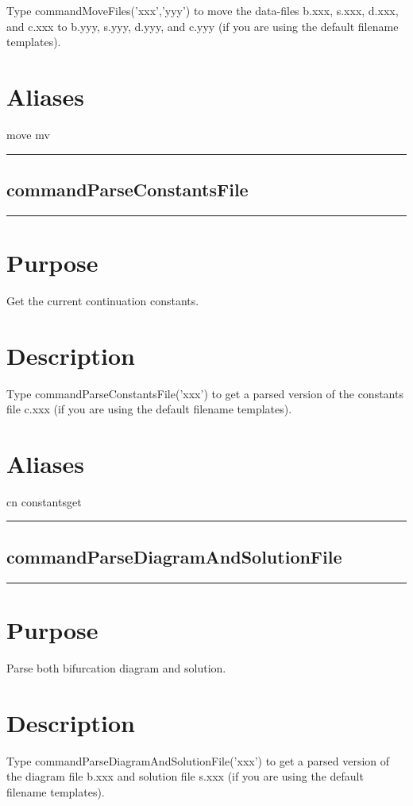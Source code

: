 \documentclass[12pt]{report}
\begin{document}
\begin{minipage}{6in}
    Type commandMoveFiles('xxx','yyy') to move the data-files b.xxx, s.xxx, d.xxx,
    and c.xxx to b.yyy, s.yyy, d.yyy, and c.yyy (if you are using the
    default filename templates).  \section*{Aliases}
move mv \medskip\hrule\end{minipage}\subsection{commandParseConstantsFile} \label{sec:clui_ref_commandParseConstantsFile}\begin{minipage}{6in}\hrule\medskip\section*{Purpose}
Get the current continuation constants.\section*{Description}

    Type commandParseConstantsFile('xxx') to get a parsed version of the constants file
    c.xxx (if you are using the default filename templates).
    \section*{Aliases}
cn constantsget \medskip\hrule\end{minipage}\subsection{commandParseDiagramAndSolutionFile} \label{sec:clui_ref_commandParseDiagramAndSolutionFile}\begin{minipage}{6in}\hrule\medskip\section*{Purpose}
Parse both bifurcation diagram and solution.\section*{Description}

    Type commandParseDiagramAndSolutionFile('xxx') to get a parsed version of the diagram file b.xxx
    and solution file s.xxx (if you are using the default filename
    templates).

\end{minipage}
\end{document}
